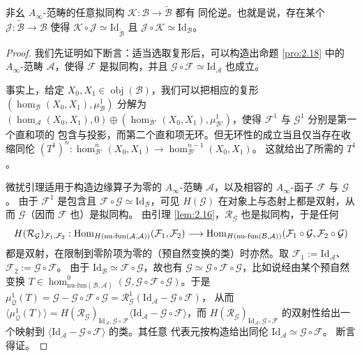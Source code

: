 \begin{Lem}\label{lem:2.19}
非幺 $A_\infty$-范畴的任意拟同构 $\mathcal K:\mathcal B\to\tilde{\mathcal B}$ 都有
同伦逆。也就是说，存在某个 $\mathcal J:\tilde{\mathcal B}\to\mathcal B$ 使得
$\mathcal K\circ\mathcal J\simeq\mathrm{Id}_{\tilde{\mathcal B}}$ 且
$\mathcal J\circ\mathcal K\simeq\mathrm{Id}_{\mathcal B}$。
\end{Lem}

\begin{proof}
我们先证明如下断言：适当选取复形后，可以构造出命题 \ref{pro:2.18} 中的 $A_\infty$-范畴
$\mathcal A$，使得 $\mathcal F$ 是拟同构，并且 $\mathcal G\circ\mathcal F\simeq
\mathrm{Id}_{\mathcal A}$ 也成立。

事实上，给定 $X_0,X_1\in\operatorname{obj}(\mathcal B)$，我们可以把相应的复形
$(\hom_{\mathcal B}(X_0,X_1),\mu^1_{\mathcal B})$ 分解为
$(\hom_{\mathcal A}(X_0,X_1),0)\oplus(\hom_{\mathcal B'}(X_0,X_1),
\mu^1_{\mathcal B'})$，使得 $\mathcal F^1$ 与 $\mathcal G^1$ 分别是第一个直和项的
包含与投影，而第二个直和项无环。但无环性的成立当且仅当存在收缩同伦
$(T^1)^n:\hom^n_{\mathcal B'}(X_0,X_1)\to\hom^{n-1}_{\mathcal B'}(X_0,X_1)$。
这就给出了所需的 $T^1$。

微扰引理适用于构造边缘算子为零的 $A_\infty$-范畴 $\mathcal A$，以及相容的
$A_\infty$-函子 $\mathcal F$ 与 $\mathcal G$。
由于 $\mathcal F^1$ 是包含且
$\mathcal F\circ\mathcal G\simeq\mathrm{Id}_{\mathcal B}$，可见 $H(\mathcal G)$
在对象上与态射上都是双射，从而 $\mathcal G$（因而 $\mathcal F$ 也）是拟同构。
由引理 \ref{lem:2.16}，$\mathcal R_{\mathcal G}$ 也是拟同构，于是任何
\[
  H(\mathcal R_{\mathcal G})_{\mathcal F_1,\mathcal F_2}:
  \operatorname{Hom}_{H(\mathrm{nu\text{-}fun}(\mathcal A,\mathcal A))}(\mathcal F_1,\mathcal F_2)
  \longrightarrow\operatorname{Hom}_{H(\mathrm{nu\text{-}fun}(\mathcal B,\mathcal A))}
  (\mathcal F_1\circ\mathcal G,\mathcal F_2\circ\mathcal G)
\]
都是双射，在限制到零阶项为零的（预自然变换的类）时亦然。取
$\mathcal F_1:=\mathrm{Id}_{\mathcal A}$、$\mathcal F_2:=\mathcal G\circ\mathcal F$。
由于 $\mathrm{Id}_{\mathcal B}\simeq\mathcal F\circ\mathcal G$，故也有
$\mathcal G\simeq\mathcal G\circ\mathcal F\circ\mathcal G$，比如说经由某个预自然
变换 $T\in\hom^0_{\mathrm{nu\text{-}fun}(\mathcal B,\mathcal A)}(\mathcal G,
\mathcal G\circ\mathcal F\circ\mathcal G)$。于是
$\mu^1_{\mathcal Q}(T)=\mathcal G-\mathcal G\circ\mathcal F\circ\mathcal G=
\mathcal R^1_{\mathcal G}(\mathrm{Id}_{\mathcal A}-\mathcal G\circ\mathcal F)$，
从而 $\langle\mu^1_{\mathcal Q}(T)\rangle=H(\mathcal R_{\mathcal G})_{\mathrm{Id}
_{\mathcal A},\mathcal G\circ\mathcal F}\langle\mathrm{Id}_{\mathcal A}-\mathcal G
\circ\mathcal F\rangle$，而 $H(\mathcal R_{\mathcal G})_{\mathrm{Id}_{\mathcal A},
\mathcal G\circ\mathcal F}$ 的双射性给出一个映射到
$\langle\mathrm{Id}_{\mathcal A}-\mathcal G\circ\mathcal F\rangle$ 的类。其任意
代表元按构造给出同伦 $\mathrm{Id}_{\mathcal A}\simeq\mathcal G\circ\mathcal F$。
断言得证。


\end{proof}
